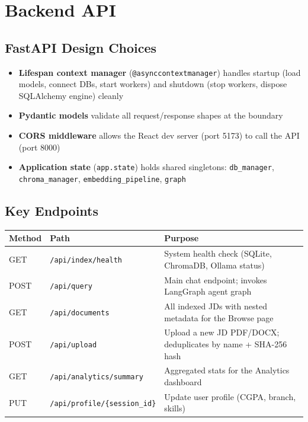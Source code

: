 \documentclass[12pt, a4paper]{article}
\begin{document}
\section{Backend API}

\subsection{FastAPI Design Choices}

\begin{itemize}[noitemsep]
    \item \textbf{Lifespan context manager} (\texttt{@asynccontextmanager}) handles startup (load models, connect DBs, start workers) and shutdown (stop workers, dispose SQLAlchemy engine) cleanly
    \item \textbf{Pydantic models} validate all request/response shapes at the boundary
    \item \textbf{CORS middleware} allows the React dev server (port 5173) to call the API (port 8000)
    \item \textbf{Application state} (\texttt{app.state}) holds shared singletons: \texttt{db\_manager}, \texttt{chroma\_manager}, \texttt{embedding\_pipeline}, \texttt{graph}
\end{itemize}

\subsection{Key Endpoints}

\begin{tabularx}{\textwidth}{llX}
\toprule
\textbf{Method} & \textbf{Path} & \textbf{Purpose} \\
\midrule
GET  & \texttt{/api/index/health} & System health check (SQLite, ChromaDB, Ollama status) \\
POST & \texttt{/api/query}        & Main chat endpoint; invokes LangGraph agent graph \\
GET  & \texttt{/api/documents}   & All indexed JDs with nested metadata for the Browse page \\
POST & \texttt{/api/upload}      & Upload a new JD PDF/DOCX; deduplicates by name + SHA-256 hash \\
GET  & \texttt{/api/analytics/summary} & Aggregated stats for the Analytics dashboard \\
PUT  & \texttt{/api/profile/\{session\_id\}} & Update user profile (CGPA, branch, skills) \\
\bottomrule
\end{tabularx}
\end{document}
